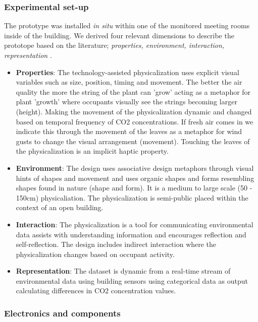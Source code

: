 \subsubsection{Experimental set-up}

The prototype was installed \textit{in situ} within one of the monitored meeting rooms inside of the building. We derived four relevant dimensions to describe the prototope based on the literature; \textit{properties, environment, interaction, representation} \cite{sauve_physecology_2022, hornecker_design_2023, anhalt_university_germany_design_2022}.

\begin{itemize}
  \item \textbf{Properties}: The technology-assisted physicalization uses explicit visual variables such as size, position, timing and movement. The better the air quality the more the string of the plant can 'grow' acting as a metaphor for plant 'growth' where occupants visually see the strings becoming larger (height). Making the movement of the physicalization dynamic and changed based on temporal frequency of CO2 concentrations. If fresh air comes in we indicate this through the movement of the leaves as a metaphor for wind gusts to change the visual arrangement (movement). Touching the leaves of the physicalization is an implicit haptic property.
  \item \textbf{Environment}: The design uses associative design metaphors through visual hints of shapes and movement and uses organic shapes and forms resembling shapes found in nature (shape and form). It is a medium to large scale (50 - 150cm) physicaliation. The physicalization is semi-public placed within the context of an open building.
  \item \textbf{Interaction}: The physicalization is a tool for communicating environmental data assists with understanding information and encourages reflection and self-reflection. The design includes indirect interaction where the physicalization changes based on occupant activity.
  \item \textbf{Representation}: The dataset is dynamic from a real-time stream of environmental data using building sensors using categorical data as output calculating differences in CO2 concentration values.
\end{itemize}

\subsubsection{Electronics and components}

